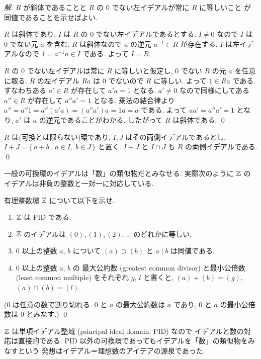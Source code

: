 \documentclass[12pt,twoside]{jarticle}
\newcommand\commentout[1]{#1}
\newcommand\commentout[1]{}
\begin{document}
\commentout{
\begin{proof}[解]
 $R$ が斜体であることと $R$ の $0$ でない左イデアルが常に $R$ に等しいこと
 が同値であることを示せばよい.

 $R$ は斜体であり, $I$ は $R$ の $0$ でない左イデアルであるとする.
 $I\ne 0$ なので $I$ は $0$ でない元 $a$ を含む. 
 $R$ は斜体なので $a$ の逆元 $a^{-1}\in R$ が存在する.
 $I$ は左イデアルなので $1=a^{-1}a\in I$ である.
 よって $I=R$.

 $R$ の $0$ でない左イデアルは常に $R$ に等しいと仮定し, 
 $0$ でない $R$ の元 $a$ を任意に取る.
 $R$ の左イデアル $Ra$ は $0$ でないので $R$ に等しい.
 よって $1\in Ra$ である. 
 すなわちある $a'\in R$ が存在して $a'a=1$ となる.  
 $a'\ne 0$ なので同様にしてある $a''\in R$ が存在して $a''a'=1$ となる.
 乗法の結合律より $a''=a''1=a''(a'a)=(a''a')a=1a=a$ である.
 よって $aa'=a''a'=1$ となり, $a'$ は $a$ の逆元であることがわかる.
 したがって $R$ は斜体である.
 \qed
\end{proof}
}

\begin{question}
 $R$ は(可換とは限らない)環であり, $I,J$ はその両側イデアルであるとし, %
 $I+J=\{\,a+b\mid a\in I,\; b\in J\,\}$ と置く.
 $I+J$ と $I\cap J$ も $R$ の両側イデアルである.
 \qed
\end{question}

一般の可換環のイデアルは「数」の類似物だとみなせる.
実際次のように $\Z$ のイデアルは非負の整数と一対一に対応している.

\begin{question}[$\Z$ のイデアル]
 有理整数環 $\Z$ について以下を示せ.
 \begin{enumerate}
  \item $\Z$ は PID である.
  \item $\Z$ のイデアルは $(0),(1),(2),\ldots$ のどれかに等しい.
  \item $0$ 以上の整数 $a$, $b$ について %
   $(a)\supset (b)$ と $a\mid b$ は同値である.
  \item $0$ 以上の整数 $a$, $b$ の
   最大公約数 (greatest common divisor) と最小公倍数 (least common multiple)
   をそれぞれ $g$, $l$ と書くと, $(a)+(b)=(g)$, $(a)\cap(b)=(l)$.
 \end{enumerate}
 ($0$ は任意の数で割り切れる.
 $0$ と $a$ の最大公約数は $a$ であり, 
 $0$ と $a$ の最小公倍数は $0$ とみなす.)
 \qed
\end{question}

$\Z$ は単項イデアル整域 (principal ideal domain, PID) なので
イデアルと数の対応は直接的である.
PID 以外の可換環であってもイデアルを「数」の類似物をみなすという
発想はイデアル＝理想数のアイデアの源泉であった.
\end{document}

